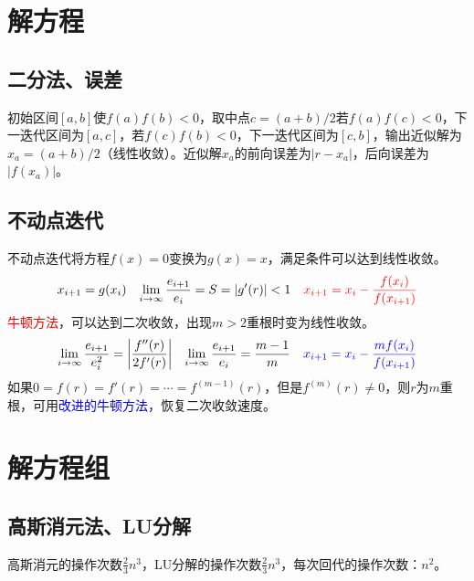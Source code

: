 \documentclass[twocolumn]{article}
\begin{document}
\section{解方程}

\subsection{二分法、误差}
初始区间$[a,b]$使$f(a)f(b)<0$，取中点$c=(a+b)/2$若$f(a)f(c)<0$，下一迭代区间为$[a,c]$，若$f(c)f(b)<0$，下一迭代区间为$[c,b]$，输出近似解为$x_a=(a+b)/2$（线性收敛）。近似解$x_a$的前向误差为$|r-x_a|$，后向误差为$|f(x_a)|$。

\subsection{不动点迭代}
不动点迭代将方程$f(x)=0$变换为$g(x)=x$，满足条件可以达到线性收敛。
\begin{align*}
    x_{i+1} & =g(x_i) & \lim_{i\rightarrow \infty}\frac{e_{i+1}}{e_i}=S=|g'(r)| & <1 & \textcolor{red}{x_{i+1}=x_i-\frac{f(x_i)}{f(x_{i+1})}}
\end{align*}
\textcolor{red}{牛顿方法}，可以达到二次收敛，出现$m>2$重根时变为线性收敛。
\begin{align*}
     \lim_{i\rightarrow \infty}\frac{e_{i+1}}{e_i^2} & =\left| \frac{f''(r)}{2f'(r)} \right| & \lim_{i\rightarrow \infty}\frac{e_{i+1}}{e_i} & =\frac{m-1}{m} & \textcolor{blue}{x_{i+1}=x_i-\frac{mf(x_i)}{f(x_{i+1})}}
\end{align*}
如果$0=f(r)=f'(r)=\cdots=f^{(m-1)}(r)$，但是$f^{(m)}(r)\neq 0$，则$r$为$m$重根，可用\textcolor{blue}{改进的牛顿方法}，恢复二次收敛速度。

\section{解方程组}

\subsection{高斯消元法、LU分解}
高斯消元的操作次数$\frac{2}{3}n^3$，LU分解的操作次数$\frac{2}{3}n^3$，每次回代的操作次数：$n^2$。
\end{document}
